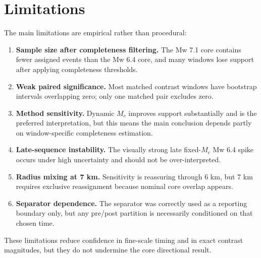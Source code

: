 \documentclass[11pt]{article}
\begin{document}
\section{Limitations}
The main limitations are empirical rather than procedural:
\begin{enumerate}[leftmargin=1.5em]
    \item \textbf{Sample size after completeness filtering.} The Mw 7.1 core contains fewer assigned events than the Mw 6.4 core, and many windows lose support after applying completeness thresholds.
    \item \textbf{Weak paired significance.} Most matched contrast windows have bootstrap intervals overlapping zero; only one matched pair excludes zero.
    \item \textbf{Method sensitivity.} Dynamic $M_c$ improves support substantially and is the preferred interpretation, but this means the main conclusion depends partly on window-specific completeness estimation.
    \item \textbf{Late-sequence instability.} The visually strong late fixed-$M_c$ Mw 6.4 spike occurs under high uncertainty and should not be over-interpreted.
    \item \textbf{Radius mixing at 7 km.} Sensitivity is reassuring through 6 km, but 7 km requires exclusive reassignment because nominal core overlap appears.
    \item \textbf{Separator dependence.} The separator was correctly used as a reporting boundary only, but any pre/post partition is necessarily conditioned on that chosen time.
\end{enumerate}
These limitations reduce confidence in fine-scale timing and in exact contrast magnitudes, but they do not undermine the core directional result.
\end{document}
